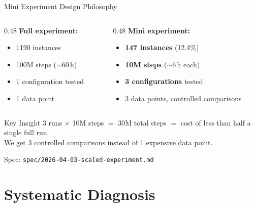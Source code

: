 \documentclass[aspectratio=169,11pt]{beamer}
\begin{document}
\begin{frame}{Mini Experiment Design Philosophy}
  \begin{columns}[T]
    \begin{column}{0.48\textwidth}
      \textbf{Full experiment:}
      \begin{itemize}
        \item 1190 instances
        \item 100M steps ($\sim$60\,h)
        \item 1 configuration tested
        \item 1 data point
      \end{itemize}
    \end{column}
    \begin{column}{0.48\textwidth}
      \textbf{Mini experiment:}
      \begin{itemize}
        \item \textcolor{accent}{\textbf{147 instances}} (12.4\%)
        \item \textcolor{accent}{\textbf{10M steps}} ($\sim$6\,h each)
        \item \textcolor{accent}{\textbf{3 configurations}} tested
        \item 3 data points, controlled comparisons
      \end{itemize}
    \end{column}
  \end{columns}

  \bigskip
  \begin{block}{Key Insight}
    3 runs $\times$ 10M steps $=$ 30M total steps $=$ cost of less than half a single full run.\\
    We get 3 controlled comparisons instead of 1 expensive data point.
  \end{block}

  \bigskip
  Spec: \texttt{spec/2026-04-03-scaled-experiment.md}
\end{frame}

\section{Systematic Diagnosis}
\end{document}
